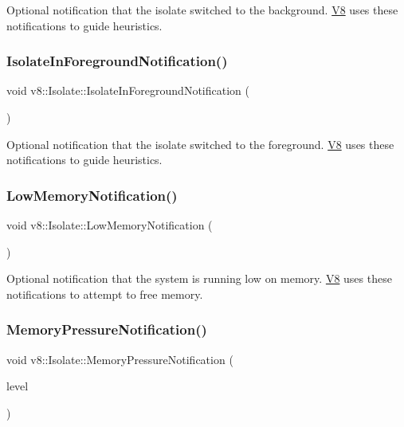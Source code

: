 Optional notification that the isolate switched to the background. \mbox{\hyperlink{classv8_1_1V8}{V8}} uses these notifications to guide heuristics. \mbox{\label{classv8_1_1Isolate_afaa09b3cb3a20f53bdcdce4b154d928f}} 
\subsubsection{\texorpdfstring{Isolate\+In\+Foreground\+Notification()}{IsolateInForegroundNotification()}}
{\footnotesize\ttfamily void v8\+::\+Isolate\+::\+Isolate\+In\+Foreground\+Notification (\begin{DoxyParamCaption}{ }\end{DoxyParamCaption})}

Optional notification that the isolate switched to the foreground. \mbox{\hyperlink{classv8_1_1V8}{V8}} uses these notifications to guide heuristics. \mbox{\label{classv8_1_1Isolate_aaf446f4877e4707a93d2c406fffd9fd6}} 
\subsubsection{\texorpdfstring{Low\+Memory\+Notification()}{LowMemoryNotification()}}
{\footnotesize\ttfamily void v8\+::\+Isolate\+::\+Low\+Memory\+Notification (\begin{DoxyParamCaption}{ }\end{DoxyParamCaption})}

Optional notification that the system is running low on memory. \mbox{\hyperlink{classv8_1_1V8}{V8}} uses these notifications to attempt to free memory. \mbox{\label{classv8_1_1Isolate_ae1b8d5696ba55dd3412989811c44c373}} 
\subsubsection{\texorpdfstring{Memory\+Pressure\+Notification()}{MemoryPressureNotification()}}
{\footnotesize\ttfamily void v8\+::\+Isolate\+::\+Memory\+Pressure\+Notification (\begin{DoxyParamCaption}\item[{\mbox{\hyperlink{namespacev8_ae0e9a25bf51e518585f555806e7dc7b9}{Memory\+Pressure\+Level}}}]{level }\end{DoxyParamCaption})}

